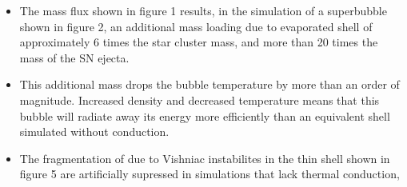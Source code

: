 \documentclass{report}
\begin{document}
\fontsize{30pt}{1em}\selectfont
\begin{itemize}
	\setlength{\itemindent}{0em}
	\item The mass flux shown in figure 1 results, in the simulation of a
	superbubble shown in figure 2, an additional mass loading due to evaporated shell of
	approximately 6 times the star cluster mass, and more than 20 times the mass of
	the SN ejecta.
	\item This additional mass drops the bubble temperature by more than an
	order of magnitude.  Increased density and decreased temperature means that
	this bubble will radiate away its energy more efficiently than an equivalent
	shell simulated without conduction.
	\item The fragmentation of due to Vishniac instabilites in the thin shell
	shown in figure 5 are artificially supressed in simulations that lack
	thermal conduction,
\end{itemize}
\end{document}

